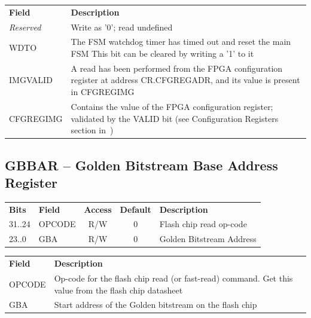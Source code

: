 \documentclass[a4paper,11pt]{article}
\begin{document}
\begin{appendices}
{\begin{tabular}{l p{}}
  \textbf{Field}  & \textbf{Description} \\
  \textit{Reserved} & Write as '0'; read undefined \\
  WDTO            & The FSM watchdog timer has timed out and reset the main FSM \newline
                    This bit can be cleared by writing a '1' to it \\
  IMGVALID        & A read has been performed from the FPGA configuration
                    register at address CR.CFGREGADR, and its value is
                    present in CFGREGIMG \\
  CFGREGIMG       & Contains the value of the FPGA configuration register;
                    validated by the VALID bit (see Configuration Registers
                    section in~\cite{ug380}) \\
  \end{tabular}
}

\subsection{GBBAR -- Golden Bitstream Base Address Register}
\label{app:gbbar}

\begin{tabular}{l l c c l}
\textbf{Bits} & \textbf{Field}    & \textbf{Access} & \textbf{Default} & \textbf{Description} \\
31..24        & OPCODE            & R/W             & 0                & Flash chip read op-code \\
23..0         & GBA               & R/W             & 0                & Golden Bitstream Address \\
\end{tabular}

\vspace*{11pt}

\noindent
{
  \begin{tabular}{l p{}}

  \textbf{Field}    & \textbf{Description} \\
  OPCODE            & Op-code for the flash chip read (or fast-read) command. Get
                      this value from the flash chip datasheet \\
  GBA               & Start address of the Golden bitstream on the flash chip \\
  \end{tabular}
}


\end{appendices}
\end{document}
